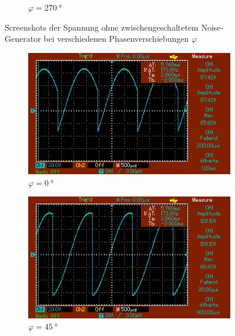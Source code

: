 \begin{figure}
\begin{subfigure}{0.3\textwidth}
        \caption{$\varphi = \SI{270}{\degree}$}
        \label{fig:1_270}
    \end{subfigure}
    \caption{Screenshots der Spannung ohne zwischengeschaltetem Noise-Generator bei verschiedenen Phasenverschiebungen $\varphi$}
    \label{fig:1}
\end{figure}

\begin{figure}
    \centering
    \begin{subfigure}{0.3\textwidth}
        \centering
        \includegraphics[width=\textwidth]{images/2_0.png}
        \caption{$\varphi = \SI{0}{\degree}$}
        \label{fig:2_0}
    \end{subfigure}
    \begin{subfigure}{0.3\textwidth}
        \centering
        \includegraphics[width=\textwidth]{images/2_45.png}
        \caption{$\varphi = \SI{45}{\degree}$}
        \label{fig:2_45}
    \end{subfigure}
    \begin{subfigure}{0.3\textwidth}

\end{subfigure}
\end{figure}
